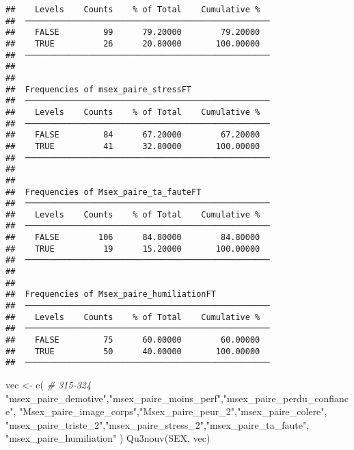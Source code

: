 \documentclass[
]{article}
\newenvironment{Shaded}{\begin{snugshade}}{\end{snugshade}}
\newcommand{\CommentTok}[1]{\textcolor[rgb]{0.56,0.35,0.01}{\textit{#1}}}
\newcommand{\FunctionTok}[1]{\textcolor[rgb]{0.00,0.00,0.00}{#1}}
\newcommand{\NormalTok}[1]{#1}
\newcommand{\OtherTok}[1]{\textcolor[rgb]{0.56,0.35,0.01}{#1}}
\newcommand{\StringTok}[1]{\textcolor[rgb]{0.31,0.60,0.02}{#1}}
\begin{document}
\begin{verbatim}
##    Levels    Counts    % of Total    Cumulative %   
##  ────────────────────────────────────────────────── 
##    FALSE         99      79.20000        79.20000   
##    TRUE          26      20.80000       100.00000   
##  ────────────────────────────────────────────────── 
## 
## 
##  Frequencies of msex_paire_stressFT                 
##  ────────────────────────────────────────────────── 
##    Levels    Counts    % of Total    Cumulative %   
##  ────────────────────────────────────────────────── 
##    FALSE         84      67.20000        67.20000   
##    TRUE          41      32.80000       100.00000   
##  ────────────────────────────────────────────────── 
## 
## 
##  Frequencies of Msex_paire_ta_fauteFT               
##  ────────────────────────────────────────────────── 
##    Levels    Counts    % of Total    Cumulative %   
##  ────────────────────────────────────────────────── 
##    FALSE        106      84.80000        84.80000   
##    TRUE          19      15.20000       100.00000   
##  ────────────────────────────────────────────────── 
## 
## 
##  Frequencies of Msex_paire_humiliationFT            
##  ────────────────────────────────────────────────── 
##    Levels    Counts    % of Total    Cumulative %   
##  ────────────────────────────────────────────────── 
##    FALSE         75      60.00000        60.00000   
##    TRUE          50      40.00000       100.00000   
##  ──────────────────────────────────────────────────
\end{verbatim}

\begin{Shaded}
\begin{Highlighting}[]
\NormalTok{vec }\OtherTok{\textless{}{-}} \FunctionTok{c}\NormalTok{(   }\CommentTok{\# 315{-}324}
  \StringTok{"msex\_paire\_demotive"}\NormalTok{,}\StringTok{"msex\_paire\_moins\_perf"}\NormalTok{,}\StringTok{"msex\_paire\_perdu\_confiance"}\NormalTok{,}
  \StringTok{"Msex\_paire\_image\_corps"}\NormalTok{,}\StringTok{"Msex\_paire\_peur\_2"}\NormalTok{,}\StringTok{"msex\_paire\_colere"}\NormalTok{,}
  \StringTok{"msex\_paire\_triste\_2"}\NormalTok{,}\StringTok{"msex\_paire\_stress\_2"}\NormalTok{,}\StringTok{"msex\_paire\_ta\_faute"}\NormalTok{,}
  \StringTok{"msex\_paire\_humiliation"}
\NormalTok{  )}
\FunctionTok{Qu3nouv}\NormalTok{(SEX, vec)}
\end{Highlighting}
\end{Shaded}
\end{document}
